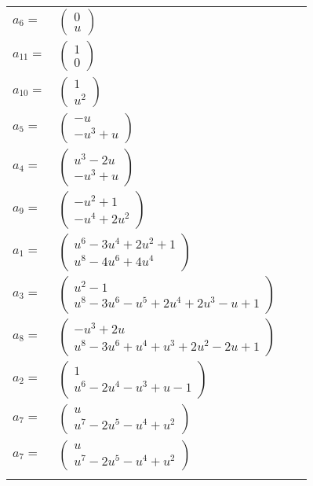 \documentclass[1p]{elsarticle_modified}
\theoremstyle{definition}
\begin{document}
\begin{tabular}{m{7pt} m{180pt} m{7pt} m{180pt} }
\flushright $a_{6}=$&$\begin{pmatrix}0\\u\end{pmatrix}$ \\
\flushright $a_{11}=$&$\begin{pmatrix}1\\0\end{pmatrix}$ \\
\flushright $a_{10}=$&$\begin{pmatrix}1\\u^2\end{pmatrix}$ \\
\flushright $a_{5}=$&$\begin{pmatrix}- u\\- u^3+u\end{pmatrix}$ \\
\flushright $a_{4}=$&$\begin{pmatrix}u^3-2 u\\- u^3+u\end{pmatrix}$ \\
\flushright $a_{9}=$&$\begin{pmatrix}- u^2+1\\- u^4+2 u^2\end{pmatrix}$ \\
\flushright $a_{1}=$&$\begin{pmatrix}u^6-3 u^4+2 u^2+1\\u^8-4 u^6+4 u^4\end{pmatrix}$ \\
\flushright $a_{3}=$&$\begin{pmatrix}u^2-1\\u^8-3 u^6- u^5+2 u^4+2 u^3- u+1\end{pmatrix}$ \\
\flushright $a_{8}=$&$\begin{pmatrix}- u^3+2 u\\u^8-3 u^6+u^4+u^3+2 u^2-2 u+1\end{pmatrix}$ \\
\flushright $a_{2}=$&$\begin{pmatrix}1\\u^6-2 u^4- u^3+u-1\end{pmatrix}$ \\
\flushright $a_{7}=$&$\begin{pmatrix}u\\u^7-2 u^5- u^4+u^2\end{pmatrix}$\\ \flushright $a_{7}=$&$\begin{pmatrix}u\\u^7-2 u^5- u^4+u^2\end{pmatrix}$\\&\end{tabular}
\end{document}
